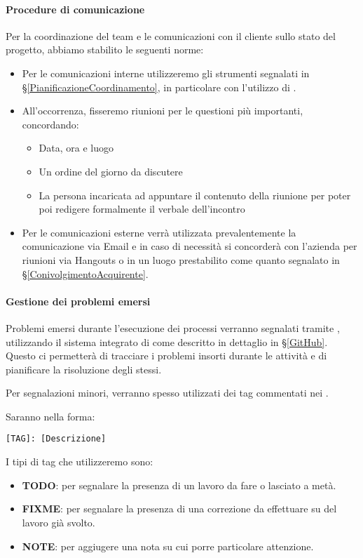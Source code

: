 			\paragraph{Procedure di comunicazione}
			Per la coordinazione del team e le comunicazioni con il cliente sullo stato del progetto, abbiamo stabilito le seguenti norme:
			\begin{itemize}
				\item Per le comunicazioni interne utilizzeremo gli strumenti segnalati in \S\ref{PianificazioneCoordinamento},
					in particolare con l'utilizzo di .
				\item All'occorrenza, fisseremo riunioni per le questioni più importanti, concordando:
					\begin{itemize}
						\item Data, ora e luogo
						\item Un ordine del giorno da discutere
						\item La persona incaricata ad appuntare il contenuto della riunione per poter poi redigere formalmente il verbale dell'incontro
					\end{itemize}
				\item Per le comunicazioni esterne verrà utilizzata prevalentemente la comunicazione via Email e in caso di necessità si concorderà con l'azienda per riunioni via Hangouts o in un luogo prestabilito come quanto segnalato in \S\ref{ConivolgimentoAcquirente}.
			\end{itemize}


    		\paragraph{Gestione dei problemi emersi}
			Problemi emersi durante l'esecuzione dei processi verranno segnalati tramite , utilizzando il sistema integrato di
			 come descritto in dettaglio in \S\ref{GitHub}. Questo ci permetterà di tracciare i problemi insorti durante le attività
			e di pianificare la risoluzione degli stessi.\par
			Per segnalazioni minori, verranno spesso utilizzati dei tag commentati nei .
			\begin{samepage}
				Saranno nella forma:
				\begin{center}
					\texttt{[TAG]: [Descrizione]}
				\end{center}
			\end{samepage}
			I tipi di tag che utilizzeremo sono:
			\begin{itemize}
				\item \textbf{TODO}: per segnalare la presenza di un lavoro da fare o lasciato a metà.
				\item \textbf{FIXME}: per segnalare la presenza di una correzione da effettuare su del lavoro già svolto.
				\item \textbf{NOTE}: per aggiugere una nota su cui porre particolare attenzione.
			\end{itemize}

